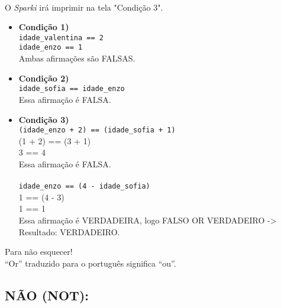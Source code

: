 \documentclass[conference]{IEEEtran}
\begin{document}
\\
\par
O \textit{Sparki} irá imprimir na tela "Condição 3".
\begin{itemize}
    \item \textbf{Condição 1)} \\
    \texttt{idade\_valentina == 2} \\
    \texttt{idade\_enzo == 1} \\
    Ambas afirmações são FALSAS.\\
    \item \textbf{Condição 2)} \\
    \texttt{idade\_sofia == idade\_enzo} \\
    Essa afirmação é FALSA.\\
    \item \textbf{Condição 3)} \\
    \texttt{(idade\_enzo + 2) == (idade\_sofia + 1)} \\
    (1 + 2) == (3 + 1) \\
    3 == 4 \\
    Essa afirmação é FALSA.\\
    \\
    \texttt{idade\_enzo == (4 - idade\_sofia)} \\
    1 == (4 - 3) \\
    1 == 1 \\
    Essa afirmação é VERDADEIRA, logo FALSO OR VERDADEIRO -> Resultado: VERDADEIRO.\\
\end{itemize}

\begin{center}
            {\color{azulbebe}Para não esquecer!}\\
            “Or” traduzido para o português significa “ou”.
\end{center}

\begin{center}
    \subsection{NÃO (NOT):}
\end{center}
\end{document}

